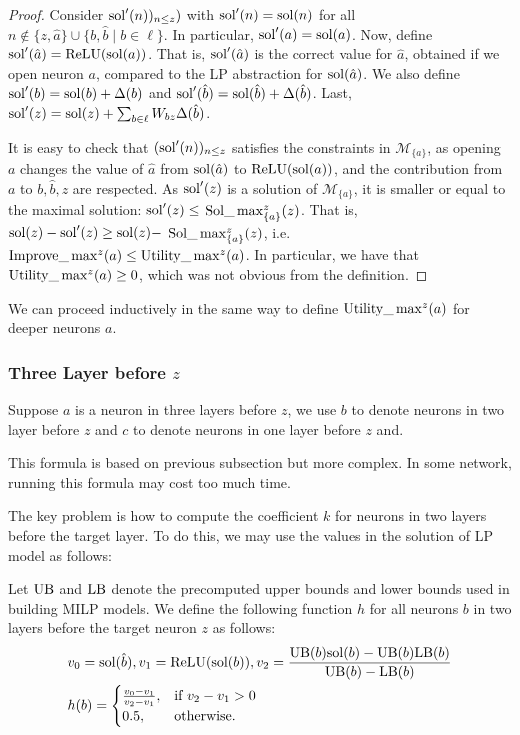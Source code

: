 	\begin{proof}
    Consider $\mathrm{sol}'(n))_{n \leq z})$ with
	$\mathrm{sol}'(n)=\mathrm{sol}(n)$ for all $n \notin \{z,\hat{a}\} \cup \{b,\hat{b} \mid b \in \ell\}$. In particular,  $\mathrm{sol}'(a) = \mathrm{sol}(a)$.
	Now, define $\mathrm{sol}'(\hat{a}) = \mathrm{ReLU}(\mathrm{sol}(a))$. 
	That is, $\mathrm{sol}'(\hat{a})$ is the correct value for $\hat{a}$, obtained if we open neuron $a$, compared to the LP abstraction for $\mathrm{sol}(\hat{a})$.
	We also define $\mathrm{sol}'(b)=\mathrm{sol}(b)+\Delta(b)$ and 
	$\mathrm{sol}'(\hat{b})=\mathrm{sol}(\hat{b}) + \Delta(\hat{b})$.
	Last, $\mathrm{sol}'(z)=\mathrm{sol}(z) + \sum_{b \in \ell} W_{bz} \Delta(\hat{b})$.
	
	It is easy to check that $(\mathrm{sol}'(n))_{n \leq z}$ satisfies the constraints in 
	$\mathcal{M}_{\{a\}}$, as opening $a$ changes the value of $\hat{a}$ from
	$\mathrm{sol}(\hat{a})$ to $\mathrm{ReLU}(\mathrm{sol}(a))$, and the contribution from $a$ to $b,\hat{b},z$ 
	are respected.
	As $\mathrm{sol}'(z)$ is a solution of $\mathcal{M}_{\{a\}}$, it is smaller or equal to the maximal solution: $\mathrm{sol}'(z) \leq$ $\mathrm{Sol}\_\max_{\{a\}}^z(z)$. That is, 
	$\mathrm{sol}(z)-\mathrm{sol}'(z) \geq \mathrm{sol}(z) -$ $\mathrm{Sol}\_\max_{\{a\}}^z(z)$, i.e. 
	$\mathrm{Improve}\_\max^z(a) \leq \mathrm{Utility}\_\max^z(a)$.
	In particular, we have that $\mathrm{Utility}\_\max^z(a) \geq 0$, which was not obvious from the definition.
	\end{proof}
	

We can proceed inductively in the same way to define $\mathrm{Utility}\_\max^z(a)$ for deeper neurons $a$.


\iffalse
\subsubsection*{Three Layer before  $z$} 

Suppose $a$ is a neuron in three layers before $z$, we use $b$ to denote neurons in two layer before $z$ and $c$ to denote neurons in one layer before $z$ and. 

This formula is based on previous subsection but more complex. In some network, running this formula may cost too much time. 

The key problem is how to compute the coefficient $k$ for neurons in two layers before the target layer. To do this, we may use the values in the solution of LP model as follows:

\begin{definition}\label{3layer}
Let $\mathrm{UB}$ and $\mathrm{LB}$ denote the precomputed upper bounds and lower bounds used in building MILP models. We define the following function $h$ for all neurons $b$ in two layers before the target neuron $z$ as follows:
	\begin{align}
		&v_0 = \mathrm{sol}(\hat{b}), v_1 = \mathrm{ReLU}(\mathrm{sol}(b)), v_2 = \frac{\mathrm{UB}(b)\mathrm{sol}(b)-\mathrm{UB}(b)\mathrm{LB}(b)}{\mathrm{UB}(b)-\mathrm{LB}(b)}\\
		&h(b) =
		\begin{cases}
			\frac{v_0-v_1}{v_2-v_1}, & \text{if } v_2-v_1 > 0\\
			0.5, & \text{otherwise.}
		\end{cases}
	\end{align} 
\end{definition} 

